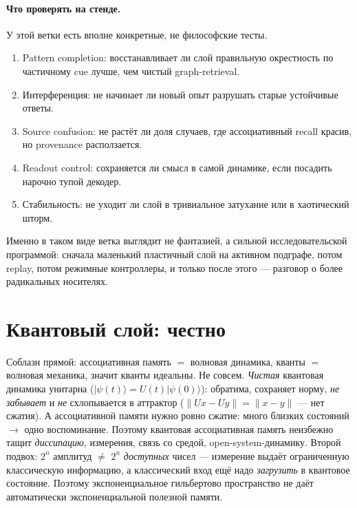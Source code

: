 \paragraph{Что проверять на стенде.} У этой ветки есть вполне конкретные, не
философские тесты.
\begin{enumerate}\itemsep2pt
\item Pattern completion: восстанавливает ли слой правильную окрестность по
частичному cue лучше, чем чистый graph-retrieval.
\item Интерференция: не начинает ли новый опыт разрушать старые устойчивые
ответы.
\item Source confusion: не растёт ли доля случаев, где ассоциативный recall
красив, но provenance расползается.
\item Readout control: сохраняется ли смысл в самой динамике, если посадить
нарочно тупой декодер.
\item Стабильность: не уходит ли слой в тривиальное затухание или в
хаотический шторм.
\end{enumerate}

Именно в таком виде ветка выглядит не фантазией, а сильной
исследовательской программой: сначала маленький пластичный слой на активном
подграфе, потом replay, потом режимные контроллеры, и только после этого ---
разговор о более радикальных носителях.

\section{Квантовый слой: честно}

Соблазн прямой: ассоциативная память $=$ волновая динамика, кванты $=$ волновая механика,
значит кванты идеальны. Не совсем. \emph{Чистая} квантовая динамика унитарна
($|\psi(t)\rangle=U(t)|\psi(0)\rangle$): обратима, сохраняет норму, \emph{не забывает} и
\emph{не} схлопывается в аттрактор ($\|Ux-Uy\|=\|x-y\|$ — нет сжатия). А ассоциативной памяти
нужно ровно сжатие: много близких состояний $\to$ одно воспоминание. Поэтому квантовая
ассоциативная память неизбежно тащит \emph{диссипацию}, измерения, связь со средой,
open-system-динамику. Второй подвох: $2^n$ амплитуд $\ne$ $2^n$ \emph{доступных} чисел —
измерение выдаёт ограниченную классическую информацию, а классический вход ещё надо
\emph{загрузить} в квантовое состояние. Поэтому экспоненциальное гильбертово пространство не
даёт автоматически экспоненциальной полезной памяти.

